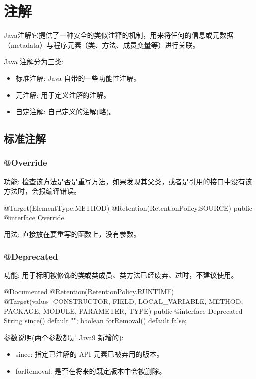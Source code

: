 \section{注解}

Java注解它提供了一种安全的类似注释的机制，用来将任何的信息或元数据（metadata）与程序元素（类、方法、成员变量等）进行关联。

Java 注解分为三类:
\begin{itemize}
    \item 标准注解: Java 自带的一些功能性注解。
    \item 元注解: 用于定义注解的注解。
    \item 自定注解: 自己定义的注解(略)。
\end{itemize}

\subsection{标准注解}

\subsubsection{@Override}

功能: 检查该方法是否是重写方法，如果发现其父类，或者是引用的接口中没有该方法时，会报编译错误。

\begin{Java}
@Target(ElementType.METHOD)
@Retention(RetentionPolicy.SOURCE)
public @interface Override {}
\end{Java}

用法: 直接放在要重写的函数上，没有参数。

\subsubsection{@Deprecated}

功能: 用于标明被修饰的类或类成员、类方法已经废弃、过时，不建议使用。

\begin{Java}
@Documented
@Retention(RetentionPolicy.RUNTIME)
@Target(value={CONSTRUCTOR, FIELD, LOCAL_VARIABLE, METHOD, PACKAGE, MODULE, PARAMETER, TYPE})
public @interface Deprecated {
    String since() default "";
    boolean forRemoval() default false;
}
\end{Java}

参数说明(两个参数都是 Java9 新增的):
\begin{itemize}
    \item since: 指定已注解的 API 元素已被弃用的版本。
    \item forRemoval: 是否在将来的既定版本中会被删除。
\end{itemize}

